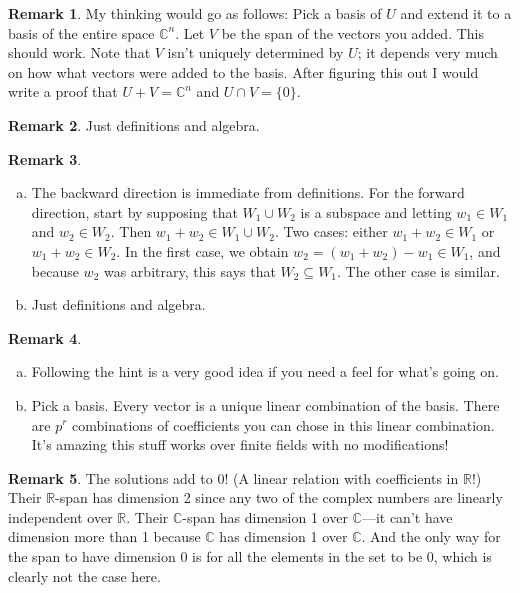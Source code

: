 \documentclass[11pt,oneside]{amsart}
\theoremstyle{definition}
\newtheorem{remark}{Remark}
\newcommand{\bC}{\mathbb{C}}
\newcommand{\bR}{\mathbb{R}}
\begin{document}
    \begin{remark}
        My thinking would go as follows: Pick a basis of $U$ and extend it to a basis of the entire space $\bC^n$. Let $V$ be the span of the vectors you added. This should work. Note that $V$ isn't uniquely determined by $U$; it depends very much on how what vectors were added to the basis. After figuring this out I would write a proof that $U+V=\bC^n$ and $U\cap V=\{0\}$.
    \end{remark}

    \begin{remark}
        Just definitions and algebra.
    \end{remark}

    \begin{remark}
        \leavevmode\begin{enumerate}[(a)]
            \item The backward direction is immediate from definitions. For the forward direction, start by supposing that $W_1\cup W_2$ is a subspace and letting $w_1\in W_1$ and $w_2\in W_2$. Then $w_1+w_2\in W_1\cup W_2$. Two cases: either $w_1+w_2\in W_1$ or $w_1+w_2\in W_2$. In the first case, we obtain $w_2=(w_1+w_2)-w_1\in W_1$, and because $w_2$ was arbitrary, this says that $W_2\subseteq W_1$. The other case is similar.
            \item Just definitions and algebra.
        \end{enumerate}
    \end{remark}

    \begin{remark}
        \leavevmode\begin{enumerate}[(a)]
            \item Following the hint is a very good idea if you need a feel for what's going on.
            \item Pick a basis. Every vector is a unique linear combination of the basis. There are $p^r$ combinations of coefficients you can chose in this linear combination. It's amazing this stuff works over finite fields with no modifications!
        \end{enumerate}
    \end{remark}

    \begin{remark}
        The solutions add to 0! (A linear relation with coefficients in $\bR$!) Their $\bR$-span has dimension 2 since any two of the complex numbers are linearly independent over $\bR$. Their $\bC$-span has dimension 1 over $\bC$---it can't have dimension more than 1 because $\bC$ has dimension 1 over $\bC$. And the only way for the span to have dimension 0 is for all the elements in the set to be 0, which is clearly not the case here.
    \end{remark}
\end{document}
